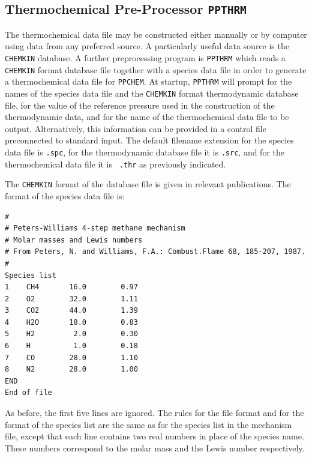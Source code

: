 \documentclass[dvips]{article}
\begin{document}
\subsection{Thermochemical Pre-Processor {\tt PPTHRM}} 
The thermochemical data file may be constructed either manually or by computer
using data from any preferred source.  A particularly useful data source is the
{\tt CHEMKIN} database.  A further
preprocessing program is {\tt PPTHRM} which reads a {\tt CHEMKIN}
format database file together with a species data file in order to generate a
thermochemical data file for {\tt PPCHEM}.  At startup, {\tt PPTHRM}
will prompt for the names of the species data file and the {\tt CHEMKIN}
format thermodynamic database file, for the value of the reference
pressure used in the construction of the thermodynamic data, and for the name
of the thermochemical data file to be output.  Alternatively,
this information can be provided in a control file preconnected to
standard input.  The default filename extension
for the species data file is {\tt .spc}, for the thermodynamic database
file it is {\tt .src}, and for the thermochemical data file it is {\tt
.thr} as previously indicated.

The {\tt CHEMKIN} format of the database file is given in relevant
publications.  The format of the species data file is: 
\begin{verbatim}
#
# Peters-Williams 4-step methane mechanism 
# Molar masses and Lewis numbers
# From Peters, N. and Williams, F.A.: Combust.Flame 68, 185-207, 1987.
#
Species list
1    CH4       16.0        0.97
2    O2        32.0        1.11
3    CO2       44.0        1.39
4    H2O       18.0        0.83
5    H2         2.0        0.30
6    H          1.0        0.18
7    CO        28.0        1.10
8    N2        28.0        1.00
END
End of file
\end{verbatim}
As before, the first five lines are ignored.  The rules for the file
format and for the format of the species list are the same as for the
species list in the mechanism file, except
that each line contains two real numbers in place of the species name.
These numbers correspond to the molar mass and the Lewis number
respectively. 

\newpage
\end{document}
